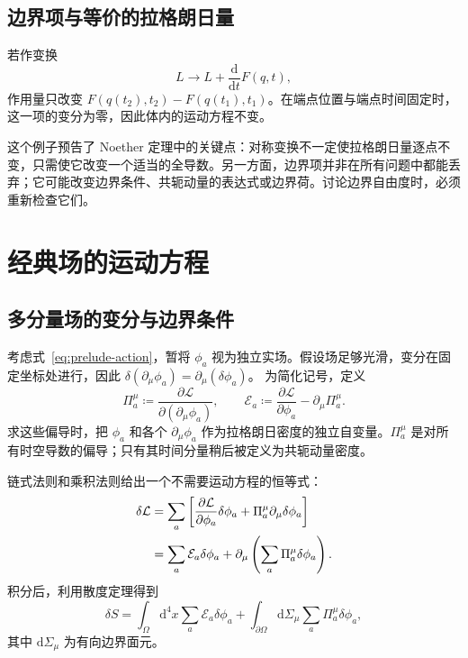 \subsection{边界项与等价的拉格朗日量}

若作变换
\begin{equation}
  L\longrightarrow L+\frac{\mathrm{d}}{\mathrm{d}t}F(q,t),
\end{equation}
作用量只改变 $F(q(t_{2}),t_{2})-F(q(t_{1}),t_{1})$。在端点位置与端点时间固定时，这一项的变分为零，因此体内的运动方程不变。

这个例子预告了 Noether 定理中的关键点：对称变换不一定使拉格朗日量逐点不变，只需使它改变一个适当的全导数。另一方面，边界项并非在所有问题中都能丢弃；它可能改变边界条件、共轭动量的表达式或边界荷。讨论边界自由度时，必须重新检查它们。

\section{经典场的运动方程}
\label{sec:prelude-field-equations}

\subsection{多分量场的变分与边界条件}

考虑式~\eqref{eq:prelude-action}，暂将 $\phi_{a}$ 视为独立实场。假设场足够光滑，变分在固定坐标处进行，因此
$\delta(\partial_{\mu}\phi_{a})=\partial_{\mu}(\delta\phi_{a})$。
为简化记号，定义
\begin{equation}
  \Pi_{a}^{\mu}\coloneqq
  \frac{\partial\mathcal{L}}{\partial(\partial_{\mu}\phi_{a})},
  \qquad
  \mathcal{E}_{a}\coloneqq
  \frac{\partial\mathcal{L}}{\partial\phi_{a}}-\partial_{\mu}\Pi_{a}^{\mu}.
  \label{eq:prelude-euler-expression}
\end{equation}
求这些偏导时，把 $\phi_{a}$ 和各个 $\partial_{\mu}\phi_{a}$ 作为拉格朗日密度的独立自变量。$\Pi_{a}^{\mu}$ 是对所有时空导数的偏导；只有其时间分量稍后被定义为共轭动量密度。

链式法则和乘积法则给出一个不需要运动方程的恒等式：
\begin{align}
  \delta\mathcal{L}
  &=\sum_{a}\left[
    \frac{\partial\mathcal{L}}{\partial\phi_{a}}\delta\phi_{a}
    +\Pi_{a}^{\mu}\partial_{\mu}\delta\phi_{a}\right]\notag\\
  &=\sum_{a}\mathcal{E}_{a}\delta\phi_{a}
    +\partial_{\mu}\left(\sum_{a}\Pi_{a}^{\mu}\delta\phi_{a}\right).
  \label{eq:prelude-variation-identity}
\end{align}
积分后，利用散度定理得到
\begin{equation}
  \delta S=\int_{\Omega}\mathrm{d}^{4}x\sum_{a}\mathcal{E}_{a}\delta\phi_{a}
  +\int_{\partial\Omega}\mathrm{d}\Sigma_{\mu}
    \sum_{a}\Pi_{a}^{\mu}\delta\phi_{a},
  \label{eq:prelude-boundary-variation}
\end{equation}
其中 $\mathrm{d}\Sigma_{\mu}$ 为有向边界面元。

